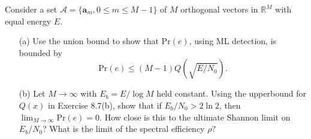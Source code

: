 \documentclass{assignment}
\begin{document}
\begin{prob}
    Consider a set $\mathcal{A}=\{\bm{a}_m,0\leq m\leq M-1\}$ of $M$ orthogonal vectors in $\mathbb{R}^M$ with equal energy $E$.
    \begin{itemize}
        \item[(a)] Use the union bound to show that $\mathrm{Pr}(e)$, using ML detection, is bounded by
        \[
            \mathrm{Pr}(e)\leq(M-1)Q(\sqrt{E/N_0}).
        \]
        \item[(b)] Let $M\rightarrow\infty$ with $E_b=E/\log M$ held constant. Using the upperbound for $Q(x)$ in Exercise 8.7(b), show that if $E_b/N_0>2\ln 2$, then $\lim_{M\rightarrow\infty}\mathrm{Pr}(e)=0$. How close is this to the ultimate Shannon limit on $E_b/N_0$? What is the limit of the spectral efficiency $\rho$?
    \end{itemize}
\end{prob}
\end{document}
